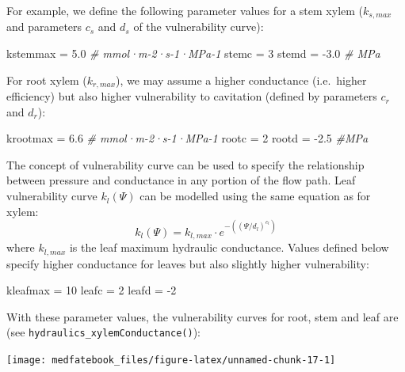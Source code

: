 \documentclass[]{book}
\newenvironment{Shaded}{\begin{snugshade}}{\end{snugshade}}
\newcommand{\DecValTok}[1]{\textcolor[rgb]{0.00,0.00,0.81}{#1}}
\newcommand{\FloatTok}[1]{\textcolor[rgb]{0.00,0.00,0.81}{#1}}
\newcommand{\StringTok}[1]{\textcolor[rgb]{0.31,0.60,0.02}{#1}}
\newcommand{\CommentTok}[1]{\textcolor[rgb]{0.56,0.35,0.01}{\textit{#1}}}
\newcommand{\NormalTok}[1]{#1}
\begin{document}
For example, we define the following parameter values for a stem xylem (\(k_{s,max}\) and parameters \(c_s\) and \(d_s\) of the vulnerability curve):

\begin{Shaded}
\begin{Highlighting}[]
\NormalTok{kstemmax =}\StringTok{ }\FloatTok{5.0} \CommentTok{# mmol·m-2·s-1·MPa-1}
\NormalTok{stemc =}\StringTok{ }\DecValTok{3} 
\NormalTok{stemd =}\StringTok{ }\FloatTok{-3.0} \CommentTok{# MPa}
\end{Highlighting}
\end{Shaded}

For root xylem (\(k_{r,max}\)), we may assume a higher conductance (i.e.~higher efficiency) but also higher vulnerability to cavitation (defined by parameters \(c_r\) and \(d_r\)):

\begin{Shaded}
\begin{Highlighting}[]
\NormalTok{krootmax =}\StringTok{ }\FloatTok{6.6} \CommentTok{# mmol·m-2·s-1·MPa-1}
\NormalTok{rootc =}\StringTok{ }\DecValTok{2}
\NormalTok{rootd =}\StringTok{ }\FloatTok{-2.5} \CommentTok{#MPa}
\end{Highlighting}
\end{Shaded}

The concept of vulnerability curve can be used to specify the relationship between pressure and conductance in any portion of the flow path. Leaf vulnerability curve \(k_l(\Psi)\) can be modelled using the same equation as for xylem:
\begin{equation}
k_l(\Psi) = k_{l,max}\cdot e^{-((\Psi/d_l)^{c_l})}
\label{eq:leafvulnerability}
\end{equation}
where \(k_{l,max}\) is the leaf maximum hydraulic conductance. Values defined below specify higher conductance for leaves but also slightly higher vulnerability:

\begin{Shaded}
\begin{Highlighting}[]
\NormalTok{kleafmax =}\StringTok{ }\DecValTok{10}
\NormalTok{leafc =}\StringTok{ }\DecValTok{2}
\NormalTok{leafd =}\StringTok{ }\DecValTok{-2}
\end{Highlighting}
\end{Shaded}

With these parameter values, the vulnerability curves for root, stem and leaf are (see \texttt{hydraulics\_xylemConductance()}):

\begin{center}\texttt{[image: medfatebook\_files/figure-latex/unnamed-chunk-17-1]} \end{center}
\end{document}
